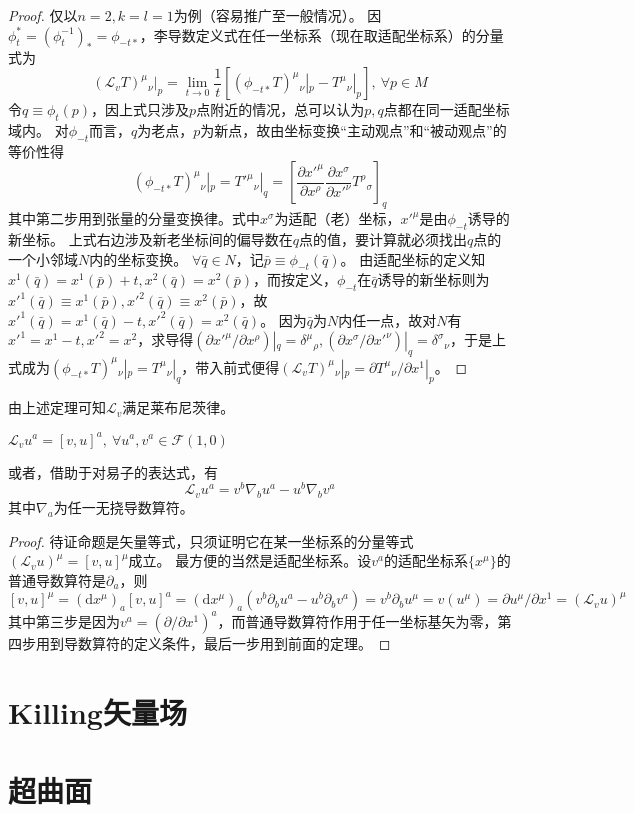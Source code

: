 \begin{proof}
仅以$n = 2, k = l = 1$为例（容易推广至一般情况）。
因$\phi_t^* = (\phi_t^{-1})_* = \phi_{-t*}$，李导数定义式在任一坐标系（现在取适配坐标系）的分量式为
$$(\mathscr{L}_vT)^{\mu}{}_{\nu}|_p = \lim\limits_{t \to 0}\frac{1}{t}[(\phi_{-t*}T)^{\mu}{}_{\nu}|_p - T^{\mu}{}_{\nu}|_p], ~ \forall p \in M$$
令$q \equiv \phi_t(p)$，因上式只涉及$p$点附近的情况，总可以认为$p, q$点都在同一适配坐标域内。
对$\phi_{-t}$而言，$q$为老点，$p$为新点，故由坐标变换``主动观点''和``被动观点''的等价性得
$$(\phi_{-t*}T)^{\mu}{}_{\nu}|_p = T'^{\mu}{}_{\nu}|_q = \left[\frac{\partial x'^{\mu}}{\partial x^{\rho}}\frac{\partial x^{\sigma}}{\partial x'^{\nu}}T^{\rho}{}_{\sigma}\right]_q$$
其中第二步用到张量的分量变换律。式中$x^{\sigma}$为适配（老）坐标，$x'^{\mu}$是由$\phi_{-t}$诱导的新坐标。
上式右边涉及新老坐标间的偏导数在$q$点的值，要计算就必须找出$q$点的一个小邻域$N$内的坐标变换。
$\forall \bar{q} \in N$，记$\bar{p} \equiv \phi_{-t}(\bar{q})$。
由适配坐标的定义知$x^1(\bar{q}) = x^1(\bar{p}) + t, x^2(\bar{q}) = x^2(\bar{p})$，而按定义，$\phi_{-t}$在$\bar{q}$诱导的新坐标则为$x'^1(\bar{q}) \equiv x^1(\bar{p}), x'^2(\bar{q}) \equiv x^2(\bar{p})$，故$x'^1(\bar{q}) = x^1(\bar{q}) - t, x'^2(\bar{q}) = x^2(\bar{q})$。
因为$\bar{q}$为$N$内任一点，故对$N$有$x'^1 = x^1 - t, x'^2 = x^2$，求导得$(\partial x'^{\mu} / \partial x^{\rho})|_q = \delta^{\mu}{}_{\rho}, (\partial x^{\sigma} / \partial x'^{\nu})|_q = \delta^{\sigma}{}_{\nu}$，于是上式成为$(\phi_{-t*}T)^{\mu}{}_{\nu}|_p = T^{\mu}{}_{\nu}|_q$，带入前式便得$(\mathscr{L}_vT)^{\mu}{}_{\nu}|_p = \partial T^{\mu}{}_{\nu} / \partial x^1|_p$。
\end{proof}

由上述定理可知$\mathscr{L}_v$满足莱布尼茨律。

\begin{theorem}
$\mathscr{L}_vu^a = [v, u]^a, ~ \forall u^a, v^a \in \mathscr{F}(1, 0)$

或者，借助于对易子的表达式，有
$$\mathscr{L}_vu^a = v^b\nabla_bu^a - u^b\nabla_bv^a$$
其中$\nabla_a$为任一无挠导数算符。
\end{theorem}

\begin{proof}
待证命题是矢量等式，只须证明它在某一坐标系的分量等式$(\mathscr{L}_vu)^{\mu} = [v, u]^{\mu}$成立。
最方便的当然是适配坐标系。设$v^a$的适配坐标系$\{x^\mu\}$的普通导数算符是$\partial_a$，则
$$[v, u]^\mu = (\mathrm{d}x^\mu)_a[v, u]^a = (\mathrm{d}x^\mu)_a(v^b\partial_bu^a - u^b\partial_bv^a) = v^b\partial_bu^\mu = v(u^\mu) = \partial u^\mu / \partial x^1 = (\mathscr{L}_vu)^\mu$$
其中第三步是因为$v^a = (\partial / \partial x^1)^a$，而普通导数算符作用于任一坐标基矢为零，第四步用到导数算符的定义条件，最后一步用到前面的定理。
\end{proof}

\section{Killing矢量场}

\section{超曲面}
